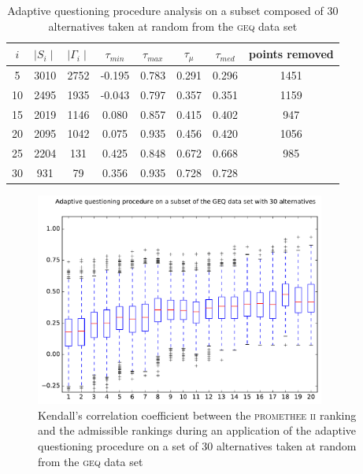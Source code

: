 \begin{table}[h]
    \centering
    \begin{tabular}{c c           c             c                    c               c            c          c}
        \toprule
        $i$  & $\mid S_i \mid$ & $\mid \Gamma_i \mid$ & $\tau_{min} $   & $\tau_{max}$ & $\tau_{\mu}$& $\tau_{med}$  & points removed  \\
         \midrule
 5 &  3010   & 2752  &-0.195 & 0.783 & 0.291 & 0.296 &  1451  \\ 
10 &  2495   & 1935  &-0.043 & 0.797 & 0.357 & 0.351 &  1159  \\ 
15 &  2019   & 1146  & 0.080 & 0.857 & 0.415 & 0.402 &   947  \\ 
20 &  2095   & 1042  & 0.075 & 0.935 & 0.456 & 0.420 &  1056  \\ 
25 &  2204   &  131  & 0.425 & 0.848 & 0.672 & 0.668 &   985  \\ 
30 &   931   &  79   & 0.356 & 0.935 & 0.728 & 0.728 &      \\ 
        \bottomrule
    \end{tabular}
    \caption{Adaptive questioning procedure analysis on a subset composed of 30 alternatives taken at random from the \textsc{geq} data set}
    \label{tbl:questioning_procedure_GEQ_3}
\end{table}

\begin{figure}[!h]
    \centering
    \includegraphics[width=0.85\textwidth]{referenced_promethee/src/boxplot_geq_seed_3.pdf}
    \caption{Kendall's correlation coefficient between the \textsc{promethee ii} ranking and the admissible rankings during an application of the adaptive questioning procedure on a set of 30 alternatives taken at random from the \textsc{geq} data set}
    \label{fig:boxplot_geq_seed_3}
\end{figure}

